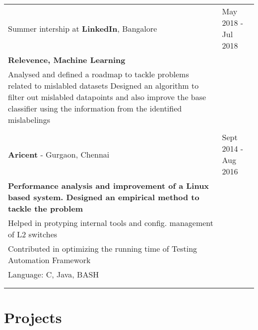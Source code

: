 \documentclass[a4paper,10pt]{article} %
\begin{document}
\begin{tabular}{p{11cm}p{11cm}}	
        \textsf{Summer intership at \textbf{LinkedIn}, Bangalore}        & \textsf{May 2018 - Jul 2018} \\
        \textbf{Relevence, Machine Learning} & \\
        \textsf{Analysed and defined a roadmap to tackle problems related to
        mislabled datasets}
        \textsf{Designed an algorithm to filter out mislabled datapoints and
        also improve the base classifier using the information from the
    identified mislabelings} & \\
                                                                                               &\\
 
        \textsf{\textbf{Aricent} - Gurgaon, Chennai}        & \textsf{Sept 2014 - Aug 2016} \\
        \textbf{Performance analysis and improvement of a Linux based system.
        Designed an empirical method to tackle the problem} & \\
        \textsf{Helped in protyping internal tools and config. management of L2 switches} & \\
        \textsf{Contributed in optimizing the running time of Testing Automation Framework} & \\
        \textsf{Language: C, Java, BASH}                                                 & \\
                                                                                                & \\
                                                                                               &\\
\end{tabular}



\section{Projects}
\end{document}
